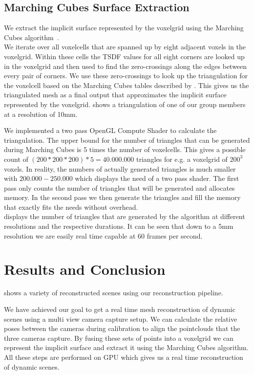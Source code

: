 \documentclass[10pt,twocolumn,letterpaper]{article}
\begin{document}
\subsection{Marching Cubes Surface Extraction}
We extract the implicit surface represented by the voxelgrid using the Marching Cubes algorithm~\cite{MarchingCubes}.\\
We iterate over all voxelcells that are spanned up by eight adjacent voxels in the voxelgrid. Within these cells the TSDF values for all eight corners are looked up in the voxelgrid and then used to find the zero-crossings along the edges between every pair of corners. We use these zero-crossings to look up the triangulation for the voxelcell based on the Marching Cubes tables described by \cite{MarchingCubes}. This gives us the triangulated mesh as a final output that approximates the implicit surface represented by the voxelgrid.  shows a triangulation of one of our group members at a resolution of 10mm.

We implemented a two pass OpenGL Compute Shader to calculate the triangulation. The upper bound for the number of triangles that can be generated during Marching Cubes is 5 times the number of voxelcells. This gives a possible count of $(200 * 200 * 200) * 5 = 40.000.000$ triangles for e.g. a voxelgrid of $200^3$ voxels. In reality, the numbers of actually generated triangles is much smaller with $200.000 - 250.000$ which displays the need of a two pass shader. The first pass only counts the number of triangles that will be generated and allocates memory. In the second pass we then generate the triangles and fill the memory that exactly fits the needs without overhead.\\
 displays the number of triangles that are generated by the algorithm at different resolutions and the respective durations. It can be seen that down to a 5mm resolution we are easily real time capable at 60 frames per second.

\section{Results and Conclusion}
 shows a variety of reconstructed scenes using our reconstruction pipeline.

We have achieved our goal to get a real time mesh reconstruction of dynamic scenes using a multi view camera capture setup. We can calculate the relative poses between the cameras during calibration to align the pointclouds that the three cameras capture. By fusing these sets of points into a voxelgrid we can represent the implicit surface and extract it using the Marching Cubes algorithm. All these steps are performed on GPU which gives us a real time reconstruction of dynamic scenes.
\end{document}
